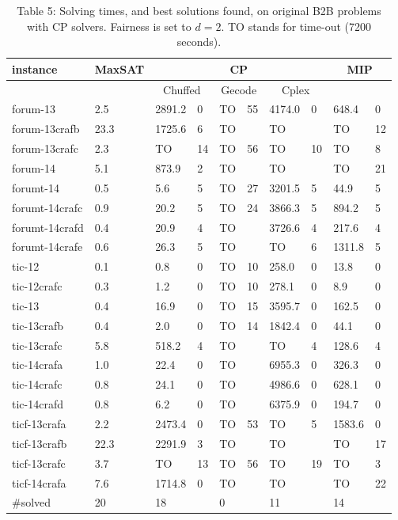 \documentclass[10pt]{article}
\begin{document}
\begin{table}[h]
\begin{center}
\captionsetup{labelformat=empty}
\caption{Table 5: Solving times, and best solutions found, on original B2B problems with CP solvers. Fairness is set to $d=2$. TO stands for time-out (7200 seconds).}
\begin{tabular}{|l|l|l|l|l|l|l|l|l|l|}
\hline
\multirow{2}{*}{instance} & \multirow{2}{*}{MaxSAT} & \multicolumn{6}{|c|}{CP} & \multicolumn{2}{|c|}{\multirow{2}{*}{MIP}} \\
\hline
 &  & \multicolumn{2}{|c|}{Chuffed} & \multicolumn{2}{|c|}{Gecode} & \multicolumn{2}{|c|}{Cplex} &  &  \\
\hline
forum-13 & 2.5 & 2891.2 & 0 & TO & 55 & 4174.0 & 0 & 648.4 & 0 \\
\hline
forum-13crafb & 23.3 & 1725.6 & 6 & TO &  & TO &  & TO & 12 \\
\hline
forum-13crafc & 2.3 & TO & 14 & TO & 56 & TO & 10 & TO & 8 \\
\hline
forum-14 & 5.1 & 873.9 & 2 & TO &  & TO &  & TO & 21 \\
\hline
forumt-14 & 0.5 & 5.6 & 5 & TO & 27 & 3201.5 & 5 & 44.9 & 5 \\
\hline
forumt-14crafc & 0.9 & 20.2 & 5 & TO & 24 & 3866.3 & 5 & 894.2 & 5 \\
\hline
forumt-14crafd & 0.4 & 20.9 & 4 & TO &  & 3726.6 & 4 & 217.6 & 4 \\
\hline
forumt-14crafe & 0.6 & 26.3 & 5 & TO &  & TO & 6 & 1311.8 & 5 \\
\hline
tic-12 & 0.1 & 0.8 & 0 & TO & 10 & 258.0 & 0 & 13.8 & 0 \\
\hline
tic-12crafc & 0.3 & 1.2 & 0 & TO & 10 & 278.1 & 0 & 8.9 & 0 \\
\hline
tic-13 & 0.4 & 16.9 & 0 & TO & 15 & 3595.7 & 0 & 162.5 & 0 \\
\hline
tic-13crafb & 0.4 & 2.0 & 0 & TO & 14 & 1842.4 & 0 & 44.1 & 0 \\
\hline
tic-13crafc & 5.8 & 518.2 & 4 & TO &  & TO & 4 & 128.6 & 4 \\
\hline
tic-14crafa & 1.0 & 22.4 & 0 & TO &  & 6955.3 & 0 & 326.3 & 0 \\
\hline
tic-14crafc & 0.8 & 24.1 & 0 & TO &  & 4986.6 & 0 & 628.1 & 0 \\
\hline
tic-14crafd & 0.8 & 6.2 & 0 & TO &  & 6375.9 & 0 & 194.7 & 0 \\
\hline
ticf-13crafa & 2.2 & 2473.4 & 0 & TO & 53 & TO & 5 & 1583.6 & 0 \\
\hline
ticf-13crafb & 22.3 & 2291.9 & 3 & TO &  & TO &  & TO & 17 \\
\hline
ticf-13crafc & 3.7 & TO & 13 & TO & 56 & TO & 19 & TO & 3 \\
\hline
ticf-14crafa & 7.6 & 1714.8 & 0 & TO &  & TO &  & TO & 22 \\
\hline
\#solved & 20 & 18 &  & 0 &  & 11 &  & 14 &  \\
\hline
\end{tabular}
\end{center}
\end{table}
\end{document}
